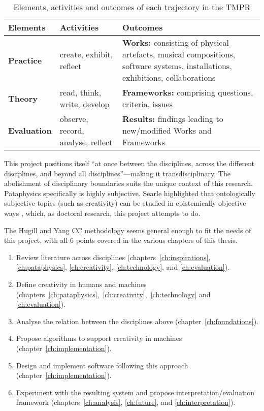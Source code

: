 \begin{table}[!htbp]
\caption[Elements, activities and outcomes of the TMPR]{Elements, activities and outcomes of each trajectory in the TMPR}
\label{tab:tmpr}
  \begin{tabu}{X[1]X[2]X[3]}
  \toprule
  \textbf{Elements}
  &
  \textbf{Activities}
  &
  \textbf{Outcomes}
  \\ \midrule
  \textbf{Practice}
  &
  create, exhibit, reflect
  &
  \textbf{Works:} consisting of physical artefacts, musical compositions, software systems, installations, exhibitions, collaborations
  \\ \midrule
  \textbf{Theory}
  &
  read, think, write, develop
  &
  \textbf{Frameworks:} comprising questions, criteria, issues
  \\ \midrule
  \textbf{Evaluation}
  &
  observe, record, analyse, reflect
  &
  \textbf{Results:} findings leading to new/modified Works and Frameworks
  \\ \bottomrule
  \end{tabu}
\end{table}

\spirals

This project positions itself ``at once between the disciplines, across the different disciplines, and beyond all disciplines''---making it transdisciplinary. The abolishment of disciplinary boundaries suits the unique context of this research. Pataphysics specifically is highly subjective. Searle highlighted that ontologically subjective topics (such as creativity) can be studied in epistemically objective ways \autocite*{Searle2015}, which, as doctoral research, this project attempts to do.

The Hugill and Yang \ac{CC} methodology seems general enough to fit the needs of this project, with all 6 points covered in the various chapters of this thesis.

\begin{enumerate}
  \item Review literature across disciplines (chapters~\ref{ch:inspirations}, \ref{ch:pataphysics}, \ref{ch:creativity}, \ref{ch:technology}, and \ref{ch:evaluation}).
  \item Define creativity in humans and machines (chapters~\ref{ch:pataphysics},~\ref{ch:creativity},~\ref{ch:technology} and \ref{ch:evaluation}).
  \item Analyse the relation between the disciplines above (chapter~\ref{ch:foundations}).
  \item Propose algorithms to support creativity in machines (chapter~\ref{ch:implementation}).
  \item Design and implement software following this approach (chapter~\ref{ch:implementation}).
  \item Experiment with the resulting system and propose interpretation/evaluation framework (chapters~\ref{ch:analysis}, \ref{ch:future}, and \ref{ch:interpretation}).
\end{enumerate}

